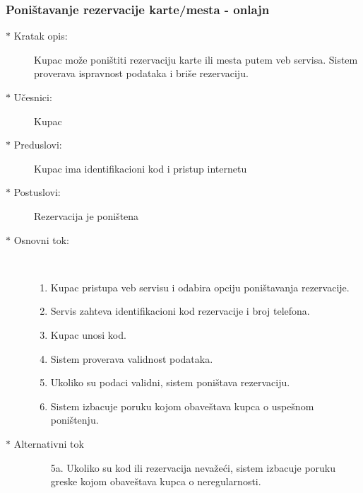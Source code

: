 \subsubsection{Poni\v stavanje rezervacije karte/mesta - onlajn}
\begin{description}
  \item[$\ast$ Kratak opis: ] Kupac mo\v ze poni\v stiti rezervaciju karte ili mesta putem veb servisa. 
			 	Sistem proverava ispravnost podataka i bri\v se rezervaciju.
  \item[$\ast$ U\v cesnici: ] Kupac
  \item[$\ast$ Preduslovi: ] Kupac ima identifikacioni kod i pristup internetu
  \item[$\ast$ Postuslovi: ] Rezervacija je poni\v stena
  \item[$\ast$ Osnovni tok: ] \ \\
  \begin{enumerate}
    \item Kupac pristupa veb servisu i odabira opciju poni\v stavanja rezervacije.
    \item Servis zahteva identifikacioni kod rezervacije i broj telefona.
    \item Kupac unosi kod.
    \item Sistem proverava validnost podataka.
    \item Ukoliko su podaci validni, sistem poni\v stava rezervaciju.
    \item Sistem izbacuje poruku kojom obave\v stava kupca o uspe\v snom poni\v stenju.
  \end{enumerate}
  \item[$\ast$ Alternativni tok]
  \begin{enumerate}
    \item[5a. ]  Ukoliko su kod ili rezervacija neva\v ze\'ci, sistem izbacuje poruku greske kojom obave\v stava kupca o neregularnosti. 

  \end{enumerate}
  
\end{description}

